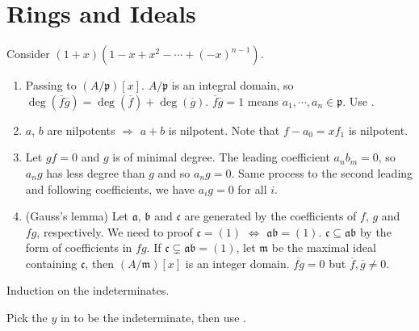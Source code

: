 \section{Rings and Ideals}

\begin{exercise}\label{ex1.1}
	Consider $(1+x)\left(1-x+x^2-\cdots+(-x)^{n-1}\right)$.
\end{exercise}

\begin{exercise}\label{ex1.2}
	\begin{enumerate}[label=(\roman*),ref=\theexercise(\roman*)]
		\item\label{ex1.2.1} Passing to $\left(A/\mathfrak{p}\right)[x]$. $A/\mathfrak{p}$ is an integral domain, so $\operatorname{deg}\left(\overline{f}\overline{g}\right)=\operatorname{deg}\left(\overline{f}\right)+\operatorname{deg}\left(\overline{g}\right)$. $\overline{f}\overline{g}=1$ means $a_1,\cdots,a_n\in\mathfrak{p}$. Use .
		\item\label{ex1.2.2} $a$, $b$ are nilpotents $\Rightarrow$ $a+b$ is nilpotent. Note that $f-a_0=xf_1$ is nilpotent.
		\item\label{ex1.2.3} Let $gf=0$ and $g$ is of minimal degree. The leading coefficient $a_nb_m=0$, so $a_ng$ has less degree than $g$ and so $a_ng=0$. Same process to the second leading and following coefficients, we have $a_ig=0$ for all $i$.
		\item\label{ex1.2.4}(Gauss's lemma) Let $\mathfrak{a}$, $\mathfrak{b}$ and $\mathfrak{c}$ are generated by the coefficients of $f$, $g$ and $fg$, respectively. We need to proof $\mathfrak{c}=(1)$ $\Leftrightarrow$ $\mathfrak{ab}=(1)$. $\mathfrak{c}\subseteq\mathfrak{ab}$ by the form of coefficients in $fg$. If $\mathfrak{c}\subsetneq\mathfrak{ab}=(1)$, let $\mathfrak{m}$ be the maximal ideal containing $\mathfrak{c}$, then $\left(A/\mathfrak{m}\right)[x]$ is an integer domain. $\overline{fg}=0$ but $\overline{f}, \overline{g}\neq0$.
	\end{enumerate}
\end{exercise}

\begin{exercise}\label{ex1.3}
	Induction on the indeterminates.
\end{exercise}

\begin{exercise}\label{ex1.4}
	Pick the $y$ in  to be the indeterminate, then use .
\end{exercise}

